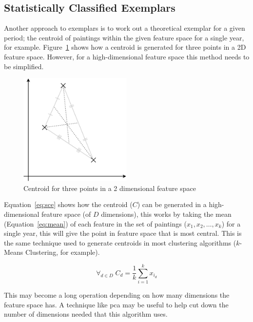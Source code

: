 \subsection{Statistically Classified Exemplars}\label{sec:sce}

Another approach to exemplars is to work out a theoretical exemplar for a given period; the 
centroid of paintings within the given feature space for a single year, for example. 
Figure~\ref{fig:centroid} shows how a centroid is generated for three points in a 2D feature
space. However, for a high-dimensional feature space this method needs to be simplified.

\begin{figure}[h]
\centering
\includegraphics[width=0.5\textwidth]{img/centroid.pdf}
\caption{Centroid for three points in a 2 dimensional feature space}\label{fig:centroid}
\end{figure}

Equation~\ref{eq:sce} shows how the centroid ($C$) can be generated in a high-dimensional feature 
space (of $D$ dimensions), this works by taking the mean (Equation~\ref{eq:mean}) of each feature 
in the set of paintings ($x_1, x_2,\dotsc,x_k$) for a single year, this will give the point in 
feature space that is most central. This is the same technique used to generate centroids in most 
clustering algorithms ($k$-Means Clustering, for example).

\begin{equation}
\label{eq:sce}
\forall_{d \in D}\;C_d = \frac{1}{k}\sum^{k}_{i=1}{x_{i_{d}}}
\end{equation}

This may become a long operation depending on how many dimensions the feature space has. A
technique like \gls{pca}\cite{Jolliffe2002Principal} may be useful to help cut down the number of dimensions needed that this
algorithm uses.


